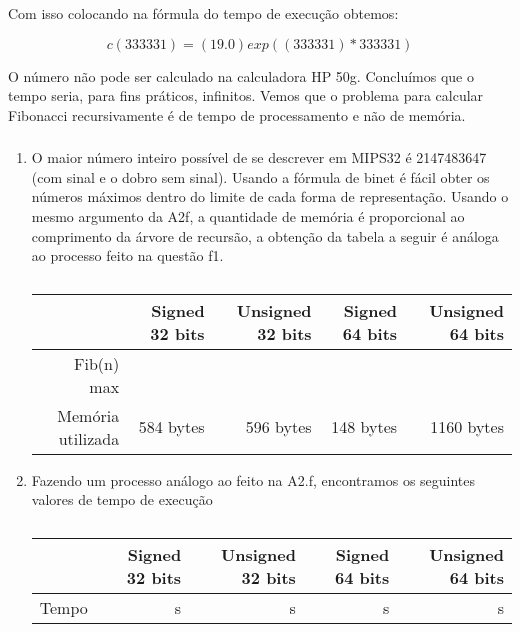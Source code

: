 \begin{enumerate}
Com isso colocando na fórmula do tempo de execução obtemos:

\begin{equation}
        c(333331) = ( 19.0)exp((333331)*333331)
\end{equation}

O número não pode ser calculado na calculadora HP 50g. Concluímos que 
o tempo seria, para fins práticos, infinitos. Vemos que o problema
para calcular Fibonacci recursivamente é de tempo de processamento e 
não de memória.

        \end{enumerate}
        
        \subsubsection{}
        \begin{enumerate}
        \item O maior número inteiro possível de se descrever em MIPS32 é 2147483647 (com sinal e o dobro sem sinal). Usando a fórmula de binet é fácil obter os números máximos dentro do limite de cada forma de representação. Usando o mesmo argumento da A2f, a quantidade de memória é proporcional ao comprimento da árvore de recursão, a obtenção da tabela a seguir é análoga ao processo feito na questão f1.
        \begin{table}[H]
        	\centering 
        	\begin{tabular}{|r|r|r|r|r|}\hline          
  & Signed 32 bits & Unsigned 32 bits & Signed 64 bits & Unsigned 64 bits \\ \hline 
Fib(n) max & & & & \\ \hline
Memória utilizada &  584 bytes & 596 bytes & 148 bytes & 1160 bytes
\\ \hline
        	\end{tabular}
        	\caption{}
        	\label{tab:}
        \end{table}

\item Fazendo um processo análogo ao feito na A2.f, encontramos os seguintes valores de tempo de execução
\begin{table}
	\centering 
	\begin{tabular}{|r|r|r|r|r|}\hline
& Signed 32 bits & Unsigned 32 bits & Signed 64 bits & Unsigned 64 bits \\ \hline
Tempo & s & s & s & s \\ \hline
	\end{tabular}
	\caption{}
	\label{tab:}
\end{table}
        \end{enumerate}

